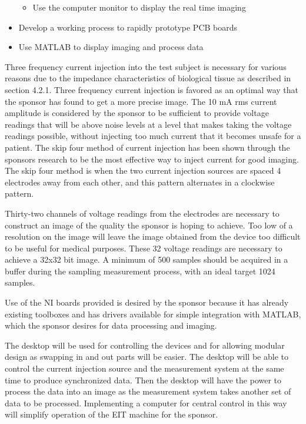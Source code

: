 \begin{itemize}
  \begin{itemize}
  \item
    Use the computer monitor to display the real time imaging
  \end{itemize}
\item
  Develop a working process to rapidly prototype PCB boards
\item
  Use MATLAB to display imaging and process data
\end{itemize}

Three frequency current injection into the test subject is necessary for
various reasons due to the impedance characteristics of biological
tissue as described in section 4.2.1. Three frequency current injection
is favored as an optimal way that the sponsor has found to get a more
precise image. The 10 mA rms current amplitude is considered by the
sponsor to be sufficient to provide voltage readings that will be above
noise levels at a level that makes taking the voltage readings possible,
without injecting too much current that it becomes unsafe for a patient.
The skip four method of current injection has been shown through the
sponsor\textquotesingle s research to be the most effective way to
inject current for good imaging. The skip four method is when the two
current injection sources are spaced 4 electrodes away from each other,
and this pattern alternates in a clockwise pattern.

Thirty-two channels of voltage readings from the electrodes are
necessary to construct an image of the quality the sponsor is hoping to
achieve. Too low of a resolution on the image will leave the image
obtained from the device too difficult to be useful for medical
purposes. These 32 voltage readings are necessary to achieve a 32x32 bit
image. A minimum of 500 samples should be acquired in a buffer during
the sampling measurement process, with an ideal target 1024 samples.

Use of the NI boards provided is desired by the sponsor because it has
already existing toolboxes and has drivers available for simple
integration with MATLAB, which the sponsor desires for data processing
and imaging.

The desktop will be used for controlling the devices and for allowing
modular design as swapping in and out parts will be easier. The desktop
will be able to control the current injection source and the measurement
system at the same time to produce synchronized data. Then the desktop
will have the power to process the data into an image as the measurement
system takes another set of data to be processed. Implementing a
computer for central control in this way will simplify operation of the
EIT machine for the sponsor.

